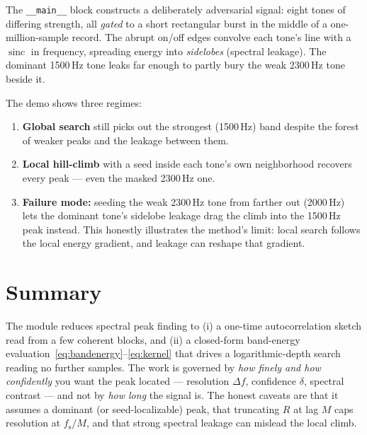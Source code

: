\documentclass[11pt]{article}
\newcommand{\R}{R}
\newcommand{\fs}{f_{\mathrm{s}}}
\DeclareMathOperator{\sinc}{sinc}
\begin{document}
The \texttt{\_\_main\_\_} block constructs a deliberately adversarial signal: eight
tones of differing strength, all \emph{gated} to a short rectangular burst in the
middle of a one-million-sample record. The abrupt on/off edges convolve each
tone's line with a $\sinc$ in frequency, spreading energy into \emph{sidelobes}
(spectral leakage). The dominant 1500\,Hz tone leaks far enough to partly bury the
weak 2300\,Hz tone beside it.

The demo shows three regimes:
\begin{enumerate}
  \item \textbf{Global search} still picks out the strongest (1500\,Hz) band
        despite the forest of weaker peaks and the leakage between them.
  \item \textbf{Local hill-climb} with a seed inside each tone's own neighborhood
        recovers every peak --- even the masked 2300\,Hz one.
  \item \textbf{Failure mode:} seeding the weak 2300\,Hz tone from farther out
        (2000\,Hz) lets the dominant tone's sidelobe leakage drag the climb into
        the 1500\,Hz peak instead. This honestly illustrates the method's limit:
        local search follows the local energy gradient, and leakage can reshape
        that gradient.
\end{enumerate}

\section{Summary}

The module reduces spectral peak finding to (i) a one-time autocorrelation sketch
read from a few coherent blocks, and (ii) a closed-form band-energy
evaluation~\eqref{eq:bandenergy}--\eqref{eq:kernel} that drives a logarithmic-depth
search reading no further samples. The work is governed by \emph{how finely and
how confidently} you want the peak located --- resolution $\Delta f$, confidence
$\delta$, spectral contrast --- and not by \emph{how long} the signal is. The
honest caveats are that it assumes a dominant (or seed-localizable) peak, that
truncating $\R$ at lag $M$ caps resolution at $\fs/M$, and that strong spectral
leakage can mislead the local climb.
\end{document}
